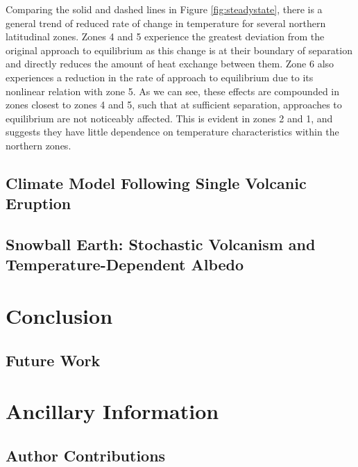 \documentclass{article}
\begin{document}
Comparing the solid and dashed lines in Figure \ref{fig:steadystate}, there is a
general trend of reduced rate of change in temperature for several northern 
latitudinal zones. Zones 4 and 5 experience the greatest deviation from the
original approach to equilibrium as this change is at their boundary of
separation and directly reduces the amount of heat exchange between them.
Zone 6 also experiences a reduction in the rate of approach to equilibrium due
to its nonlinear relation with zone 5. As we can see, these effects are
compounded in zones closest to zones 4 and 5, such that at sufficient
separation, approaches to equilibrium are not noticeably affected. This is
evident in zones 2 and 1, and suggests they have little dependence on
temperature characteristics within the northern zones. 

\subsection{Climate Model Following Single Volcanic Eruption}
\subsection{Snowball Earth: Stochastic Volcanism and Temperature-Dependent Albedo}
\label{sec:snowballearth}

\section{Conclusion}
\subsection{Future Work}

\section{Ancillary Information}
\subsection{Author Contributions}
\end{document}
